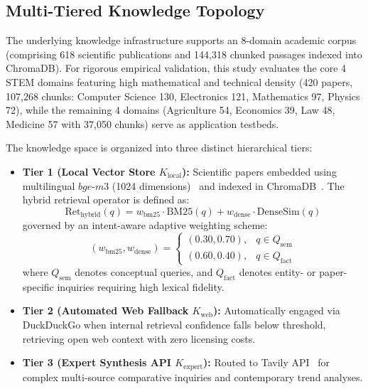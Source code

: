 \documentclass[conference]{IEEEtran}
\begin{document}
\subsection{Multi-Tiered Knowledge Topology}
The underlying knowledge infrastructure supports an 8-domain academic corpus (comprising 618 scientific publications and 144,318 chunked passages indexed into ChromaDB). For rigorous empirical validation, this study evaluates the core 4 STEM domains featuring high mathematical and technical density (420 papers, 107,268 chunks: Computer Science 130, Electronics 121, Mathematics 97, Physics 72), while the remaining 4 domains (Agriculture 54, Economics 39, Law 48, Medicine 57 with 37,050 chunks) serve as application testbeds.

The knowledge space is organized into three distinct hierarchical tiers:
\begin{itemize}
    \item \textbf{Tier 1 (Local Vector Store $K_{\text{local}}$):} Scientific papers embedded using multilingual $bge\text{-}m3$ (1024 dimensions)~\cite{chen2024bge} and indexed in ChromaDB~\cite{chroma2023}. The hybrid retrieval operator is defined as:
    \begin{equation}
    \text{Ret}_{\text{hybrid}}(q) = w_{\text{bm25}} \cdot \text{BM25}(q) + w_{\text{dense}} \cdot \text{DenseSim}(q)
    \end{equation}
    governed by an intent-aware adaptive weighting scheme:
    \begin{equation}
    (w_{\text{bm25}}, w_{\text{dense}}) = 
    \begin{cases} 
    (0.30, 0.70), & q \in Q_{\text{sem}} \\ 
    (0.60, 0.40), & q \in Q_{\text{fact}} 
    \end{cases}
    \end{equation}
    where $Q_{\text{sem}}$ denotes conceptual queries, and $Q_{\text{fact}}$ denotes entity- or paper-specific inquiries requiring high lexical fidelity.
    \item \textbf{Tier 2 (Automated Web Fallback $K_{\text{web}}$):} Automatically engaged via DuckDuckGo when internal retrieval confidence falls below threshold, retrieving open web context with zero licensing costs.
    \item \textbf{Tier 3 (Expert Synthesis API $K_{\text{expert}}$):} Routed to Tavily API~\cite{tavily2024} for complex multi-source comparative inquiries and contemporary trend analyses.
\end{itemize}
\end{document}
